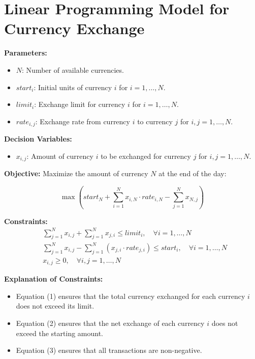 \documentclass{article}
\begin{document}
\section*{Linear Programming Model for Currency Exchange}

\textbf{Parameters:}
\begin{itemize}
    \item $N$: Number of available currencies.
    \item $start_i$: Initial units of currency $i$ for $i = 1, \ldots, N$.
    \item $limit_i$: Exchange limit for currency $i$ for $i = 1, \ldots, N$.
    \item $rate_{i,j}$: Exchange rate from currency $i$ to currency $j$ for $i, j = 1, \ldots, N$.
\end{itemize}

\textbf{Decision Variables:}
\begin{itemize}
    \item $x_{i,j}$: Amount of currency $i$ to be exchanged for currency $j$ for $i, j = 1, \ldots, N$.
\end{itemize}

\textbf{Objective:}
Maximize the amount of currency $N$ at the end of the day:

\[
\max \left( start_N + \sum_{i=1}^{N} x_{i,N} \cdot rate_{i,N} - \sum_{j=1}^{N} x_{N,j} \right)
\]

\textbf{Constraints:}
\begin{align}
    &\sum_{j=1}^{N} x_{i,j} + \sum_{j=1}^{N} x_{j,i} \leq limit_i, \quad \forall i = 1, \ldots, N \\
    &\sum_{j=1}^{N} x_{i,j} - \sum_{j=1}^{N} (x_{j,i} \cdot rate_{j,i}) \leq start_i, \quad \forall i = 1, \ldots, N \\
    &x_{i,j} \geq 0, \quad \forall i, j = 1, \ldots, N
\end{align}

\textbf{Explanation of Constraints:}
\begin{itemize}
    \item Equation (1) ensures that the total currency exchanged for each currency $i$ does not exceed its limit.
    \item Equation (2) ensures that the net exchange of each currency $i$ does not exceed the starting amount.
    \item Equation (3) ensures that all transactions are non-negative.
\end{itemize}
\end{document}
